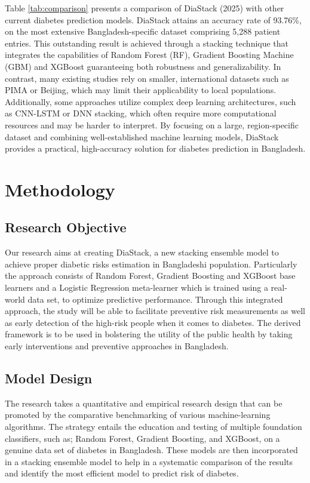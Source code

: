 \documentclass[conference, letterpaper]{IEEEtran}
\begin{document}
Table \ref{tab:comparison} presents a comparison of DiaStack (2025) with other current diabetes prediction models. DiaStack attains an accuracy rate of 93.76\%, on the most extensive Bangladesh-specific dataset comprising 5,288 patient entries. This outstanding result is achieved through a stacking technique that integrates the capabilities of Random Forest (RF), Gradient Boosting Machine (GBM) and XGBoost guaranteeing both robustness and generalizability. In contrast, many existing studies rely on smaller, international datasets such as PIMA or Beijing, which may limit their applicability to local populations. Additionally, some approaches utilize complex deep learning architectures, such as CNN-LSTM or DNN stacking, which often require more computational resources and may be harder to interpret. By focusing on a large, region-specific dataset and combining well-established machine learning models, DiaStack provides a practical, high-accuracy solution for diabetes prediction in Bangladesh.



\section{Methodology}
\label{sec:method}
\subsection{Research Objective}
Our research aims at creating DiaStack, a new stacking ensemble model to achieve proper diabetic risks estimation in Bangladeshi population. Particularly the approach consists of Random Forest, Gradient Boosting and XGBoost base learners and a Logistic Regression meta-learner which is trained using a real-world data set, to optimize predictive performance. Through this integrated approach, the study will be able to facilitate preventive risk measurements as well as early detection of the high-risk people when it comes to diabetes. The derived framework is to be used in bolstering the utility of the public health by taking early interventions and preventive approaches in Bangladesh.
\subsection{Model Design}
The research takes a quantitative and empirical research design that can be promoted by the comparative benchmarking of various machine-learning algorithms. The strategy entails the education and testing of multiple foundation classifiers, such as; Random Forest, Gradient Boosting, and XGBoost, on a genuine data set of diabetes in Bangladesh. These models are then incorporated in a stacking ensemble model to help in a systematic comparison of the results and identify the most efficient model to predict risk of diabetes.
\end{document}
